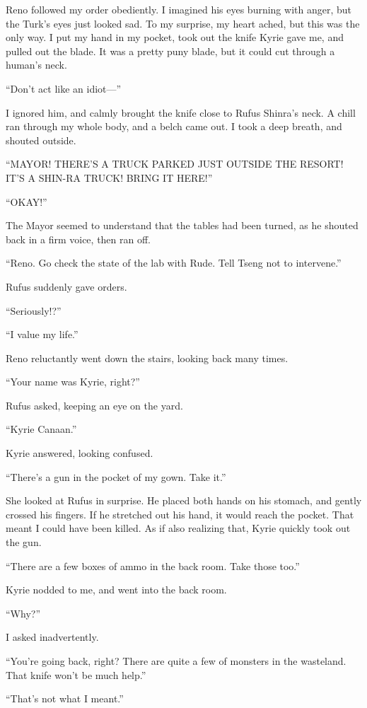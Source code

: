 \documentclass[oneside]{book}
\begin{document}
Reno followed my order obediently. I imagined his eyes burning with anger, but the Turk’s eyes just looked sad. To my surprise, my heart ached, but this was the only way. I put my hand in my pocket, took out the knife Kyrie gave me, and pulled out the blade. It was a pretty puny blade, but it could cut through a human’s neck.

“Don’t act like an idiot—”

I ignored him, and calmly brought the knife close to Rufus Shinra’s neck. A chill ran through my whole body, and a belch came out. I took a deep breath, and shouted outside.

“MAYOR! THERE’S A TRUCK PARKED JUST OUTSIDE THE RESORT! IT’S A SHIN-RA TRUCK! BRING IT HERE!”

“OKAY!”

The Mayor seemed to understand that the tables had been turned, as he shouted back in a firm voice, then ran off.

“Reno. Go check the state of the lab with Rude. Tell Tseng not to intervene.”

Rufus suddenly gave orders.

“Seriously!?”

“I value my life.”

Reno reluctantly went down the stairs, looking back many times.

“Your name was Kyrie, right?”

Rufus asked, keeping an eye on the yard.

“Kyrie Canaan.”

Kyrie answered, looking confused.

“There’s a gun in the pocket of my gown. Take it.”

She looked at Rufus in surprise. He placed both hands on his stomach, and gently crossed his fingers. If he stretched out his hand, it would reach the pocket. That meant I could have been killed. As if also realizing that, Kyrie quickly took out the gun.

“There are a few boxes of ammo in the back room. Take those too.”

Kyrie nodded to me, and went into the back room.

“Why?”

I asked inadvertently.

“You’re going back, right? There are quite a few of monsters in the wasteland. That knife won’t be much help.”

“That’s not what I meant.”
\end{document}
